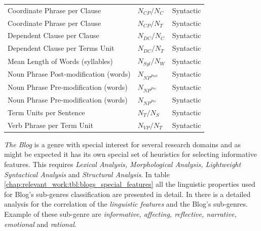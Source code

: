 \begin{table}[t]
\begin{tabular}{lll}
		Coordinate Phrase per Clause & $N_{CP}/N_{C}$ & Syntactic \\
		Coordinate Phrase per Clause & $N_{CP}/N_{T}$ & Syntactic \\
		Dependent Clause per Clause & $N_{DC}/N_{C}$ & Syntactic \\
		Dependent Clause per Terms Unit & $N_{DC}/N_{T}$ & Syntactic \\
		Mean Length of Words (syllables) & $N_{Syl}/N_{W}$ & Syntactic \\
		Noun Phrase Post-modification (words) & $N_{NP^{Post}}$ & Syntactic \\
		Noun Phrase Pre-modification (words) & $N_{NP^{Pre}}$ & Syntactic \\
		Noun Phrase Pre-modification (words) & $N_{NP^{Pre}}$ & Syntactic \\
		Term Units per Sentence & $N_{T}/N_{S}$ & Syntactic \\
		Verb Phrase per Term Unit &  $N_{VP}/N_{T}$ & Syntactic \\
		\hline
	\end{tabular}
\end{table}

\textit{The Blog} is a genre with special interest for several research domains and as might be expected it has its own special set of heuristics for selecting informative features. This requires \textit{Lexical Analysis, Morphological Analysis, Lightweight Syntactical Analysis} and \textit{Structural Analysis}. In table \ref{chap:relevant_work:tbl:blogs_special_features} all the linguistic properties used for Blog's sub-genres classification are presented in detail. In \parencite{virik2017blog} there is a detailed analysis for the correlation of the \textit{linguistic features} and the Blog's sub-genres. Example of these sub-genre are \textit{informative, affecting, reflective, narrative, emotional} and \textit{rational}.

